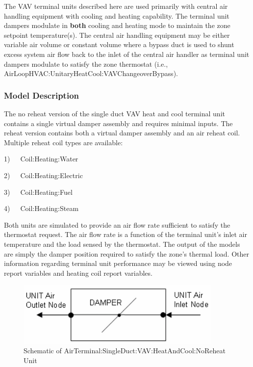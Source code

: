 The VAV terminal units described here are used primarily with central air handling equipment with cooling and heating capability. The terminal unit dampers modulate in \textbf{both} cooling and heating mode to maintain the zone setpoint temperature(s). The central air handling equipment may be either variable air volume or constant volume where a bypass duct is used to shunt excess system air flow back to the inlet of the central air handler as terminal unit dampers modulate to satisfy the zone thermostat (i.e., AirLoopHVAC:UnitaryHeatCool:VAVChangeoverBypass).

\subsubsection{Model Description}\label{model-description-000}

The no reheat version of the single duct VAV heat and cool terminal unit contains a single virtual damper assembly and requires minimal inputs. The reheat version contains both a virtual damper assembly and an air reheat coil. Multiple reheat coil types are available:

1)~~~Coil:Heating:Water

2)~~~Coil:Heating:Electric

3)~~~Coil:Heating:Fuel

4)~~~Coil:Heating:Steam

Both units are simulated to provide an air flow rate sufficient to satisfy the thermostat request. The air flow rate is a function of the terminal unit's inlet air temperature and the load sensed by the thermostat. The output of the models are simply the damper position required to satisfy the zone's thermal load. Other information regarding terminal unit performance may be viewed using node report variables and heating coil report variables.

\begin{figure}[hbtp] %
\centering
\includegraphics[width=0.9\textwidth, height=0.9\textheight, keepaspectratio=true]{media/image2791.png}
\caption{Schematic of AirTerminal:SingleDuct:VAV:HeatAndCool:NoReheat Unit \protect \label{fig:schematic-of-airterminal-singleduct-vav-002}}
\end{figure}

